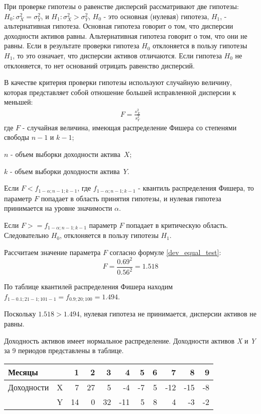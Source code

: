 \documentclass[12pt, table, twoside, a4paper]{exam}
\begin{document}
\begin{questions}
	\begin{solution}[6em]
		
		\raggedright
		При проверке гипотезы о равенстве дисперсий рассматривают две гипотезы: $H_0: \sigma_X^2=\sigma_Y^2$, и $H_1: \sigma_X^2 > \sigma_Y^2$, $H_0$ - это основная (нулевая) гипотеза, $H_1$, - альтернативная гипотеза. 
		Основная гипотеза говорит о том, что дисперсии доходности активов равны. Альтернативная гипотеза говорит о том, что они не равны. Если в результате проверки гипотеза $H_0$ отклоняется в пользу гипотезы $H_1$, то это означает, что дисперсии активов отличаются. Если гипотеза $H_0$ не отклоняется, то нет оснований отрицать равенство дисперсий.
		
		В качестве критерия проверки гипотезы используют случайную величину, которая представляет собой отношение большей исправленной дисперсии к меньшей:
		\begin{align}
		\label{dev_equal_test}
		F=\frac{s_X^2}{s_Y^2}
		\end{align}
		где
		$F$ - случайная величина, имеющая распределение Фишера со степенями свободы $n-1$ и $k-1$;
		
		$n$ - объем выборки доходности актива~$X$;
		
		$k$ - объем выборки доходности актива~$Y$.
		
		Если $F<f_{1-\alpha;n-1;k-1}$, где $f_{1-\alpha;n-1;k-1}$ - квантиль распределения Фишера, то параметр $F$ попадает в область принятия гипотезы, и нулевая гипотеза принимается на уровне значимости $\alpha$.
		
		Если  $F>=f_{1-\alpha;n-1;k-1}$ параметр $F$ попадает в критическую область. Следовательно $H_0$, отклоняется в пользу гипотезы $H_1$.
		
		Рассчитаем значение параметра $F$ согласно формуле \eqref{dev_equal_test}:
		$$F=\frac{0.69^2}{0.56^2}=1.518$$
		
		По таблице квантилей распределения Фишера находим $f_{1-0.1;21-1;101-1}=f_{0.9;20;100}=1.494$. 
		
		Поскольку $1.518>1.494$, нулевая гипотеза не принимается, дисперсии активов не равны.
	\end{solution}
	
	\question[20] Доходность активов имеет нормальное распределение. Доходности активов \textit{X} и \textit{Y} за 9 периодов представлены в таблице.
	\begin{table}[htbp]
		\centering
		\begin{tabular}{rlrrrrrrrrr}
			\toprule
			\multicolumn{1}{l}{Месяцы} &       & 1     & 2     & 3     & 4     & 5     & 6     & 7     & 8     & 9 \\\midrule
			\multicolumn{1}{l}{Доходности} & X     & 7     & 27    & 5     & -4    & -7    & 5     & -12   & -15   & -8 \\
			& Y     & 14    & 0     & 32    & -11   & 5     & 8     & 4     & -3    & -2 \\\bottomrule
		\end{tabular}%
		\label{tab:addlabel}%
	\end{table}%


\end{questions}
\end{document}
